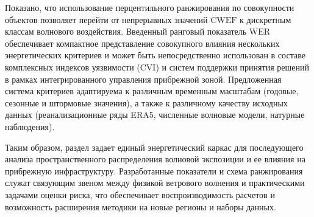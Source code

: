 Показано, что использование перцентильного ранжирования по совокупности объектов позволяет перейти от непрерывных значений $\mathrm{CWEF}$ к дискретным классам волнового воздействия.
Введенный ранговый показатель $\mathrm{WER}$ обеспечивает компактное представление совокупного влияния нескольких энергетических критериев и может быть непосредственно использован в составе комплексных индексов уязвимости (CVI) и систем поддержки принятия решений в рамках интегрированного управления прибрежной зоной.
Предложенная система критериев адаптируема к различным временным масштабам (годовые, сезонные и штормовые значения), а также к различному качеству исходных данных (реанализационные ряды ERA5, численные волновые модели, натурные наблюдения).

Таким образом, раздел задает единый энергетический каркас для последующего анализа пространственного распределения волновой экспозиции и ее влияния на прибрежную инфраструктуру.
Разработанные показатели и схема ранжирования служат связующим звеном между физикой ветрового волнения и практическими задачами оценки риска, что обеспечивает воспроизводимость расчетов и возможность расширения методики на новые регионы и наборы данных.
